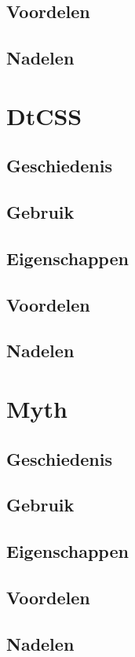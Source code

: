 \documentclass[pdftex,a4paper,12pt,twoside]{report}
\begin{document}
\subsection{Voordelen}
\subsection{Nadelen}


\section{DtCSS}
\subsection{Geschiedenis}
\subsection{Gebruik}
\subsection{Eigenschappen}
\subsection{Voordelen}
\subsection{Nadelen}


\section{Myth}
\subsection{Geschiedenis}
\subsection{Gebruik}
\subsection{Eigenschappen}
\subsection{Voordelen}
\subsection{Nadelen}
\end{document}
